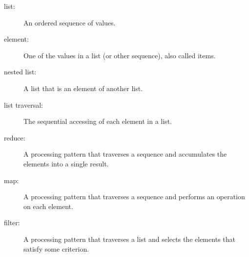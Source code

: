 \documentclass[10pt]{book}
\begin{document}
\begin{description}

\item[list:] An ordered sequence of values.

\item[element:] One of the values in a list (or other sequence),
also called items.

% 
\item[nested list:] A list that is an element of another list.

\item[list traversal:] The sequential accessing of each element in a list.

% 
% 
% 

\item[reduce:] A processing pattern that traverses a sequence 
and accumulates the elements into a single result.

\item[map:] A processing pattern that traverses a sequence and
performs an operation on each element.

\item[filter:] A processing pattern that traverses a list and
selects the elements that satisfy some criterion.

% 
% 
% 
% 
% 
% 
\end{description}
\end{document}
